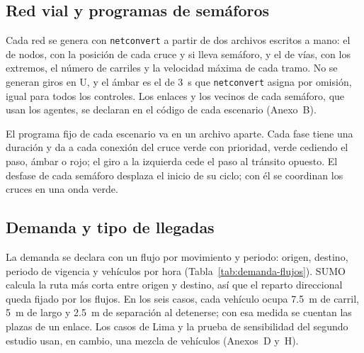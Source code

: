 \subsection{Red vial y programas de semáforos}

Cada red se genera con \texttt{netconvert} a partir de dos archivos
escritos a mano: el de nodos, con la posición de cada cruce y si lleva
semáforo, y el de vías, con los extremos, el número de carriles y la
velocidad máxima de cada tramo. No se generan giros en U, y el ámbar
es el de 3~s que \texttt{netconvert} asigna por omisión, igual para
todos los controles. Los enlaces y los vecinos de cada semáforo, que
usan los agentes, se declaran en el código de cada escenario (Anexo~B).

El programa fijo de cada escenario va en un archivo aparte. Cada fase
tiene una duración y da a cada conexión del cruce verde con prioridad,
verde cediendo el paso, ámbar o rojo; el giro a la izquierda cede el
paso al tránsito opuesto. El desfase de cada semáforo desplaza el
inicio de su ciclo; con él se coordinan los cruces en una onda verde.

\subsection{Demanda y tipo de llegadas}

La demanda se declara con un flujo por movimiento y periodo: origen,
destino, periodo de vigencia y vehículos por hora
(Tabla~\ref{tab:demanda-flujos}). SUMO calcula la ruta más corta entre
origen y destino, así que el reparto direccional queda fijado por los
flujos. En los seis casos, cada vehículo ocupa 7.5~m de carril, 5~m de
largo y 2.5~m de separación al detenerse; con esa medida se cuentan las
plazas de un enlace. Los casos de Lima y la prueba de sensibilidad del
segundo estudio usan, en cambio, una mezcla de vehículos (Anexos~D
y~H).


